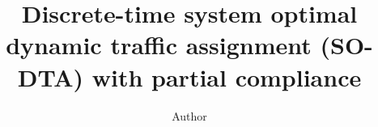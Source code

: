 \title{Discrete-time system optimal dynamic traffic assignment (SO-DTA) with partial compliance}
\author{Author}
